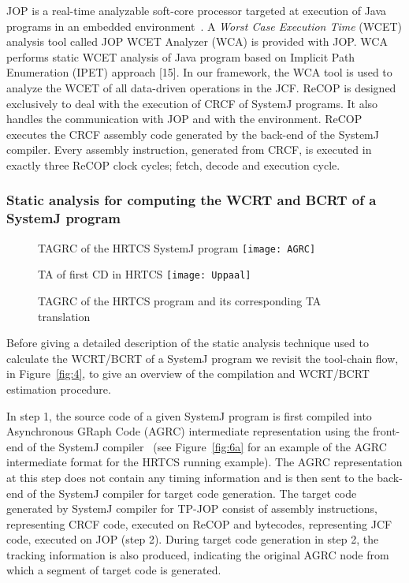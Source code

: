 JOP is a real-time analyzable soft-core processor targeted at execution
of Java programs in an embedded environment~\cite{jop:jnl:jsa2007}. A
\textit{Worst Case Execution Time} (WCET) analysis tool called JOP WCET
Analyzer (WCA) is provided with JOP. WCA performs static WCET analysis
of Java program based on Implicit Path Enumeration (IPET) approach
[15]. In our framework, the WCA tool is used to analyze the WCET of all
data-driven operations in the JCF. ReCOP is designed exclusively to deal
with the execution of CRCF of SystemJ programs. It also handles the
communication with JOP and with the environment. ReCOP executes the CRCF
assembly code generated by the back-end of the SystemJ compiler. Every
assembly instruction, generated from CRCF, is executed in exactly three
ReCOP clock cycles; fetch, decode and execution cycle.

\subsubsection{Static analysis for computing the WCRT and BCRT of a
  SystemJ program}
\label{sec:stat-analys-comp-1}

\begin{figure*}[t!]
  \begin{SubFloat}{\label{fig:6a} TAGRC of the HRTCS SystemJ program}
    \texttt{[image: AGRC]}
  \end{SubFloat}
  \begin{SubFloat}{\label{fig:6b} TA of first CD in HRTCS}
    \texttt{[image: Uppaal]}
  \end{SubFloat}
  \caption{TAGRC of the HRTCS program and its corresponding TA
    translation}
  \label{fig:6}
\end{figure*}

Before giving a detailed description of the static analysis technique
used to calculate the WCRT/BCRT of a SystemJ program we revisit the
tool-chain flow, in Figure~\ref{fig:4}, to give an overview of the
compilation and WCRT/BCRT estimation procedure.

In step 1, the source code of a given SystemJ program is first compiled
into Asynchronous GRaph Code (AGRC) intermediate representation using
the front-end of the SystemJ compiler~\cite{amal10} (see
Figure~\ref{fig:6a} for an example of the AGRC intermediate format for
the HRTCS running example). The AGRC representation at this step does
not contain any timing information and is then sent to the back-end of
the SystemJ compiler for target code generation. The target code
generated by SystemJ compiler for TP-JOP consist of assembly
instructions, representing CRCF code, executed on ReCOP and bytecodes,
representing JCF code, executed on JOP (step 2). During target code
generation in step 2, the tracking information is also produced,
indicating the original AGRC node from which a segment of target code is
generated.

